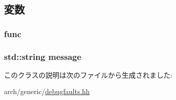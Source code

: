\subsection{変数}
\hypertarget{classGenericISA_1_1M5DebugFault_a6d48e91291fc4176cfeeaa50bcf8920d}{
\subsubsection[{func}]{ {\bf func}}}
\label{classGenericISA_1_1M5DebugFault_a6d48e91291fc4176cfeeaa50bcf8920d}
\hypertarget{classGenericISA_1_1M5DebugFault_a36bd74109f547f7f8198faf5a12d2879}{
\subsubsection[{message}]{\setlength{\rightskip}{0pt plus 5cm}std::string {\bf message}}}
\label{classGenericISA_1_1M5DebugFault_a36bd74109f547f7f8198faf5a12d2879}


このクラスの説明は次のファイルから生成されました:\begin{DoxyCompactItemize}
\item 
arch/generic/\hyperlink{debugfaults_8hh}{debugfaults.hh}\end{DoxyCompactItemize}
